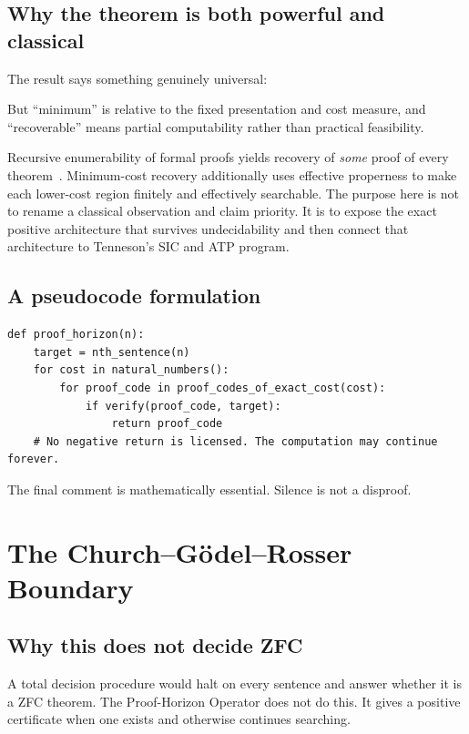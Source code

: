 \documentclass[11pt,oneside]{book}
\theoremstyle{definition}
\theoremstyle{remark}
\begin{document}
\section{Why the theorem is both powerful and classical}
The result says something genuinely universal:
\begin{center}
\end{center}
But ``minimum'' is relative to the fixed presentation and cost measure, and ``recoverable'' means partial computability rather than practical feasibility.

Recursive enumerability of formal proofs yields recovery of \emph{some} proof of every theorem~\cite{church1936,turing1936,rogers1987}. Minimum-cost recovery additionally uses effective properness to make each lower-cost region finitely and effectively searchable. The purpose here is not to rename a classical observation and claim priority. It is to expose the exact positive architecture that survives undecidability and then connect that architecture to Tenneson's SIC and ATP program.

\section{A pseudocode formulation}
\begin{lstlisting}[style=pythonstyle,caption={Pseudocode for the Universal Proof-Horizon Operator.}]
def proof_horizon(n):
    target = nth_sentence(n)
    for cost in natural_numbers():
        for proof_code in proof_codes_of_exact_cost(cost):
            if verify(proof_code, target):
                return proof_code
    # No negative return is licensed. The computation may continue forever.
\end{lstlisting}
The final comment is mathematically essential. Silence is not a disproof.

\chapter{The Church--G\"odel--Rosser Boundary}
\section{Why this does not decide ZFC}
A total decision procedure would halt on every sentence and answer whether it is a ZFC theorem. The Proof-Horizon Operator does not do this. It gives a positive certificate when one exists and otherwise continues searching.
\end{document}
